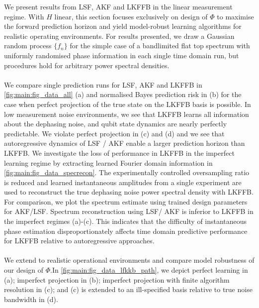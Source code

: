 We present results from LSF, AKF and LKFFB in the linear measurement regime. With $H$ linear, this section focuses exclusively on design of $\Phi$ to maximise the forward prediction horizon and yield model-robust learning algorithms for realistic operating environments. For results presented, we draw a Gaussian random process $\{ f_n \}$ for the simple case of a bandlimited flat top spectrum with uniformly randomised phase information in each single time domain run, but procedures hold for arbitrary power spectral densities.
\\
\\
We compare single prediction runs for LSF, AKF and LKFFB in \cref{fig:main:fig_data_all} (a) and normalised Bayes prediction risk in (b) for the case when perfect projection of the true state on the LKFFB basis is possible. In low measurement noise environments, we see that LKFFB learns all information about the dephasing noise, and qubit state dynamics are nearly perfectly predictable. We violate perfect projection in (c) and (d) and we see that autoregressive dynamics of LSF / AKF enable a larger prediction horizon than LKFFB. We investigate the loss of performance in LKFFB in the imperfect learning regime by extracting learned Fourier domain information in \cref{fig:main:fig_data_specrecon}. The experimentally controlled oversampling ratio is reduced and learned instantaneous amplitudes from a single experiment are used to reconstruct the true dephasing noise power spectral density with LKFFB. For comparison, we plot the spectrum estimate using trained design parameters for AKF/LSF. Spectrum reconstruction using LSF/ AKF is inferior to LKFFB in the imperfect regimes (a)-(c). This indicates that the difficulty of instantaneous phase estimation disproportionately affects time domain predictive performance for LKFFB relative to autoregressive approaches.
\\
\\
We extend to realistic operational environments and compare model robustness of our design of $\Phi$.In \cref{fig:main:fig_data_lfkkb_path}, we depict perfect learning in (a); imperfect projection in (b); imperfect projection with finite algorithm resolution in (c); and (c) is extended to an ill-specified basis relative to true noise bandwidth in (d). 
\\
\\
